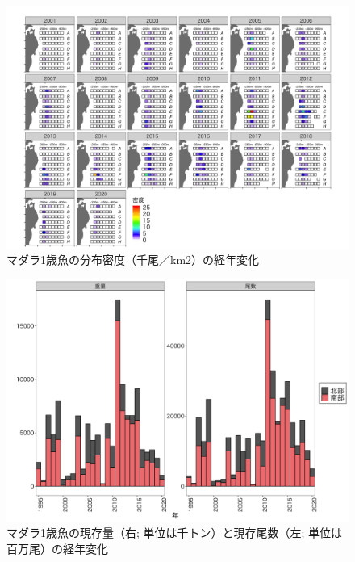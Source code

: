 \documentclass[11pt]{article} %
\begin{document}
\begin{linenumbers}
\begin{figure}[h]
  \centering
  \includegraphics[width = 14cm]{マダラ１＋dens.png}
  \caption{マダラ1歳魚の分布密度（千尾／km2）の経年変化}
\end{figure}

\begin{figure}[h]
  \centering
  \includegraphics[width = 14cm]{マダラ１＋trend.png}
  \caption{マダラ1歳魚の現存量（右; 単位は千トン）と現存尾数（左; 単位は百万尾）の経年変化}
\end{figure}


\end{linenumbers}
\end{document}
